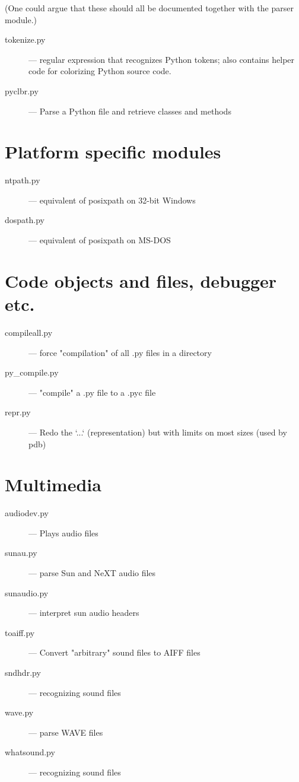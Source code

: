 (One could argue that these should all be documented together with the
parser module.)

\begin{description}
\item[tokenize.py]
--- regular expression that recognizes Python tokens; also
contains helper code for colorizing Python source code.

\item[pyclbr.py]
--- Parse a Python file and retrieve classes and methods
\end{description}


\section{Platform specific modules}

\begin{description}
\item[ntpath.py]
--- equivalent of posixpath on 32-bit Windows

\item[dospath.py]
--- equivalent of posixpath on MS-DOS
\end{description}


\section{Code objects and files, debugger etc.}

\begin{description}
\item[compileall.py]
--- force "compilation" of all .py files in a directory

\item[py_compile.py]
--- "compile" a .py file to a .pyc file

\item[repr.py]
--- Redo the `...` (representation) but with limits on most
sizes (used by pdb)
\end{description}


\section{Multimedia}

\begin{description}
\item[audiodev.py]
--- Plays audio files

\item[sunau.py]
--- parse Sun and NeXT audio files

\item[sunaudio.py]
--- interpret sun audio headers

\item[toaiff.py]
--- Convert "arbitrary" sound files to AIFF files

\item[sndhdr.py]
--- recognizing sound files

\item[wave.py]
--- parse WAVE files

\item[whatsound.py]
--- recognizing sound files
\end{description}


